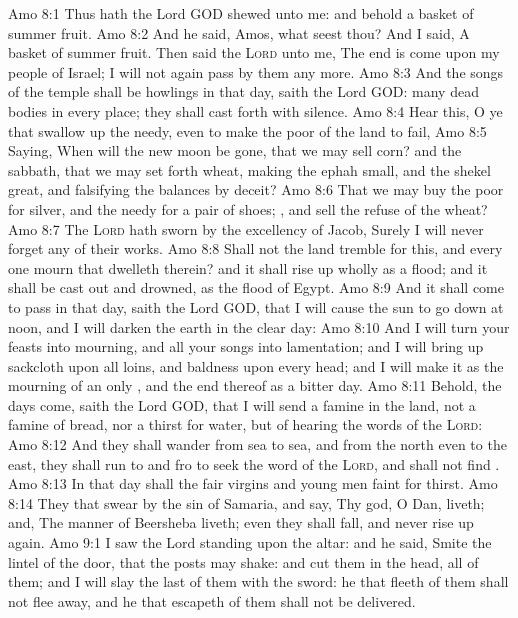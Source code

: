 \vs Amo 8:1 Thus hath the Lord GOD shewed unto me: and behold a basket of summer fruit.
\vs Amo 8:2 And he said, Amos, what seest thou? And I said, A basket of summer fruit. Then said the \textsc{Lord} unto me, The end is come upon my people of Israel; I will not again pass by them any more.
\vs Amo 8:3 And the songs of the temple shall be howlings in that day, saith the Lord GOD:  many dead bodies in every place; they shall cast  forth with silence.
\vs Amo 8:4 Hear this, O ye that swallow up the needy, even to make the poor of the land to fail,
\vs Amo 8:5 Saying, When will the new moon be gone, that we may sell corn? and the sabbath, that we may set forth wheat, making the ephah small, and the shekel great, and falsifying the balances by deceit?
\vs Amo 8:6 That we may buy the poor for silver, and the needy for a pair of shoes; , and sell the refuse of the wheat?
\vs Amo 8:7 The \textsc{Lord} hath sworn by the excellency of Jacob, Surely I will never forget any of their works.
\vs Amo 8:8 Shall not the land tremble for this, and every one mourn that dwelleth therein? and it shall rise up wholly as a flood; and it shall be cast out and drowned, as  the flood of Egypt.
\vs Amo 8:9 And it shall come to pass in that day, saith the Lord GOD, that I will cause the sun to go down at noon, and I will darken the earth in the clear day:
\vs Amo 8:10 And I will turn your feasts into mourning, and all your songs into lamentation; and I will bring up sackcloth upon all loins, and baldness upon every head; and I will make it as the mourning of an only , and the end thereof as a bitter day.
\vs Amo 8:11 Behold, the days come, saith the Lord GOD, that I will send a famine in the land, not a famine of bread, nor a thirst for water, but of hearing the words of the \textsc{Lord}:
\vs Amo 8:12 And they shall wander from sea to sea, and from the north even to the east, they shall run to and fro to seek the word of the \textsc{Lord}, and shall not find .
\vs Amo 8:13 In that day shall the fair virgins and young men faint for thirst.
\vs Amo 8:14 They that swear by the sin of Samaria, and say, Thy god, O Dan, liveth; and, The manner of Beersheba liveth; even they shall fall, and never rise up again.
\vs Amo 9:1 I saw the Lord standing upon the altar: and he said, Smite the lintel of the door, that the posts may shake: and cut them in the head, all of them; and I will slay the last of them with the sword: he that fleeth of them shall not flee away, and he that escapeth of them shall not be delivered.
